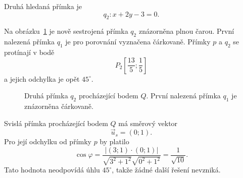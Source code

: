 \begin{example}
    Druhá hledaná přímka je
    \[
        q_2:x+2y-3=0.
    \]

    Na obrázku~\ref{fig:Second_line_through_point_given_angle} je
    nově sestrojená přímka $q_2$ znázorněna plnou čarou. První
    nalezená přímka $q_1$ je pro porovnání vyznačena čárkovaně.
    Přímky $p$ a $q_2$ se protínají v bodě
    \[
        P_2\left[\frac{13}{5};\frac15\right]
    \]
    a jejich odchylka je opět $45^\circ$.

    \begin{figure}[H]
        \centering
        \caption{Druhá přímka $q_2$ procházející bodem $Q$. První
        nalezená přímka $q_1$ je znázorněna čárkovaně.}
        \label{fig:Second_line_through_point_given_angle}
    \end{figure}

    Svislá přímka procházející bodem $Q$ má směrový vektor
    \[
        \vec{u}_s=(0;1).
    \]
    Pro její odchylku od přímky $p$ by platilo
    \[
        \cos\varphi
        =
        \frac{|(3;1)\cdot(0;1)|}
        {\sqrt{3^2+1^2}\sqrt{0^2+1^2}}
        =
        \frac{1}{\sqrt{10}}.
    \]
    Tato hodnota neodpovídá úhlu $45^\circ$, takže žádné další
    řešení nevzniká.


\end{example}
